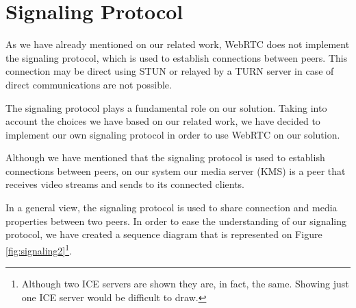 \section{Signaling Protocol}

As we have already mentioned on our related work, \ac{WebRTC} does not implement the signaling protocol, which is used to establish connections between peers. This connection may be direct using \ac{STUN} or relayed by a \ac{TURN} server in case of direct communications are not possible.

The signaling protocol plays a fundamental role on our solution. Taking into account the choices we have based on our related work, we have decided to implement our own signaling protocol in order to use \ac{WebRTC} on our solution.

Although we have mentioned that the signaling protocol is used to establish connections between peers, on our system our media server (\ac{KMS}) is a peer that receives video streams and sends to its connected clients. 

In a general view, the signaling protocol is used to share connection and media properties between two peers. In order to ease the understanding of our signaling protocol, we have created a sequence diagram that is represented on Figure \ref{fig:signaling2}\footnote{Although two \ac{ICE} servers are shown they are, in fact, the same. Showing just one \ac{ICE} server would be difficult to draw.}.


